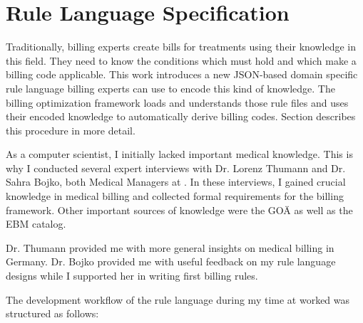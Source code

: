 \section{Rule Language Specification}\label{sec:rule-language-specification}

Traditionally, billing experts create bills for treatments using their knowledge in this field.
They need to know the conditions which must hold and which make a billing code applicable.
This work introduces a new JSON-based domain specific rule language billing experts can use to encode this kind of knowledge.
The billing optimization framework loads and understands those rule files and uses their encoded knowledge to automatically derive billing codes.
Section  describes this procedure in more detail.

As a computer scientist, I initially lacked important medical knowledge.
This is why I conducted several expert interviews with Dr. Lorenz Thumann and Dr. Sahra Bojko, both Medical Managers at \AV.
In these interviews, I gained crucial knowledge in medical billing and collected formal requirements for the billing framework.
Other important sources of knowledge were the GOÄ as well as the EBM catalog.

Dr. Thumann provided me with more general insights on medical billing in Germany.
Dr. Bojko provided me with useful feedback on my rule language designs while I supported her in writing first billing rules.

The development workflow of the rule language during my time at \AV worked was structured as follows:

